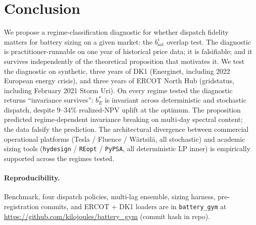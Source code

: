 \documentclass[11pt]{article}
\begin{document}
\section{Conclusion}

We propose a regime-classification diagnostic for whether dispatch fidelity matters for battery sizing on a given market: the $b_{\mathrm{sat}}^\epsilon$ overlap test. The diagnostic is practitioner-runnable on one year of historical price data; it is falsifiable; and it survives independently of the theoretical proposition that motivates it. We test the diagnostic on synthetic, three years of DK1 (Energinet, including 2022 European energy crisis), and three years of ERCOT North Hub (gridstatus, including February 2021 Storm Uri). On every regime tested the diagnostic returns ``invariance survives'': $b_E^*$ is invariant across deterministic and stochastic dispatch, despite $9$--$34\%$ realized-NPV uplift at the optimum. The proposition predicted regime-dependent invariance breaking on multi-day spectral content; the data falsify the prediction. The architectural divergence between commercial operational platforms (Tesla / Fluence / W\"{a}rtsil\"{a}, all stochastic) and academic sizing tools (\texttt{hydesign} / \texttt{REopt} / \texttt{PyPSA}, all deterministic LP inner) is empirically supported across the regimes tested.

\paragraph{Reproducibility.}
Benchmark, four dispatch policies, multi-lag ensemble, sizing harness, pre-registration commits, and ERCOT + DK1 loaders are in \texttt{battery\_gym} at \url{https://github.com/kilojoules/battery_gym} (commit hash in repo).
\end{document}
